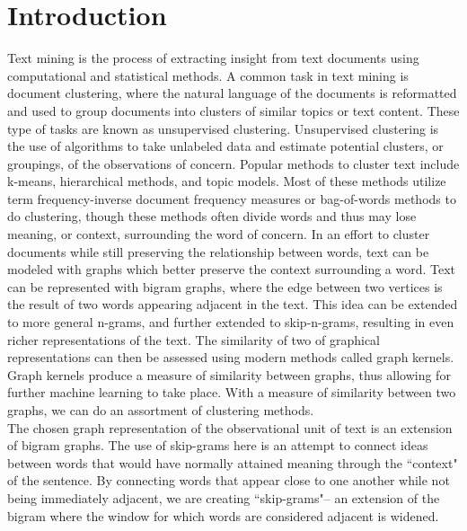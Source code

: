 %
%
%

\chapter{Introduction}
\label{introduction}


Text mining is the process of extracting insight from text documents using computational and statistical methods. A common task in text mining is document clustering, where the natural language of the documents is reformatted and used to group documents into clusters of similar topics or text content. These type of tasks are known as unsupervised clustering. Unsupervised clustering is the use of algorithms to take unlabeled data and estimate potential clusters, or groupings, of the observations of concern. Popular methods to cluster text include k-means, hierarchical methods, and topic models. Most of these methods utilize term frequency-inverse document frequency measures  or bag-of-words methods to do clustering, though these methods often divide words and thus may lose meaning, or context, surrounding the word of concern. In an effort to cluster documents while still preserving the relationship between words, text can be modeled with graphs which better preserve the context surrounding a word. Text can be represented with bigram graphs, where the edge between two vertices is the result of two words appearing adjacent in the text. This idea can be extended to more general n-grams, and further extended to skip-n-grams, resulting in even richer representations of the text. The similarity of two of graphical representations can then be assessed using modern methods called graph kernels. Graph kernels produce a measure of similarity between graphs, thus allowing for further machine learning to take place. With a measure of similarity between two graphs, we can do an assortment of clustering methods.\\
The chosen graph representation of the observational unit of text is an extension of bigram graphs. The use of skip-grams here is an attempt to connect ideas between words that would have normally attained meaning through the ``context" of the sentence. By connecting words that appear close to one another while not being immediately adjacent, we are creating ``skip-grams"-- an extension of the bigram where the window for which words are considered adjacent is widened.\\

